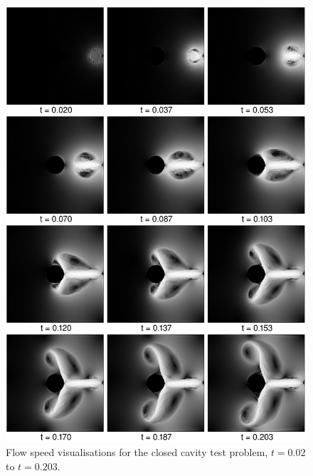 \begin{figure}[htbp]
    \includegraphics[width=\textwidth]{figures/navier_stokes/navier_0.png}
    \caption{
        Flow speed visualisations for the closed cavity test problem, $t = 0.02$ to $t = 0.203$.
    }
    \label{navier_0}
\end{figure}
